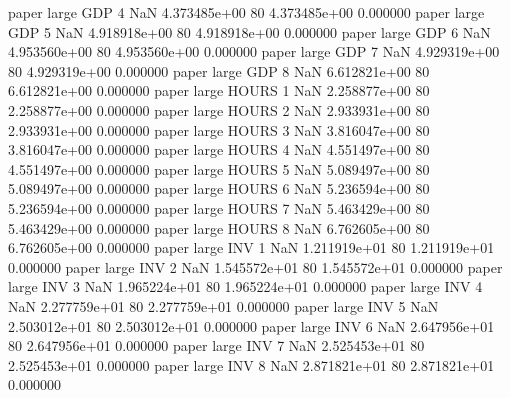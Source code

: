             paper      large      GDP                 4                  NaN 4.373485e+00 80   4.373485e+00           0.000000
            paper      large      GDP                 5                  NaN 4.918918e+00 80   4.918918e+00           0.000000
            paper      large      GDP                 6                  NaN 4.953560e+00 80   4.953560e+00           0.000000
            paper      large      GDP                 7                  NaN 4.929319e+00 80   4.929319e+00           0.000000
            paper      large      GDP                 8                  NaN 6.612821e+00 80   6.612821e+00           0.000000
            paper      large    HOURS                 1                  NaN 2.258877e+00 80   2.258877e+00           0.000000
            paper      large    HOURS                 2                  NaN 2.933931e+00 80   2.933931e+00           0.000000
            paper      large    HOURS                 3                  NaN 3.816047e+00 80   3.816047e+00           0.000000
            paper      large    HOURS                 4                  NaN 4.551497e+00 80   4.551497e+00           0.000000
            paper      large    HOURS                 5                  NaN 5.089497e+00 80   5.089497e+00           0.000000
            paper      large    HOURS                 6                  NaN 5.236594e+00 80   5.236594e+00           0.000000
            paper      large    HOURS                 7                  NaN 5.463429e+00 80   5.463429e+00           0.000000
            paper      large    HOURS                 8                  NaN 6.762605e+00 80   6.762605e+00           0.000000
            paper      large      INV                 1                  NaN 1.211919e+01 80   1.211919e+01           0.000000
            paper      large      INV                 2                  NaN 1.545572e+01 80   1.545572e+01           0.000000
            paper      large      INV                 3                  NaN 1.965224e+01 80   1.965224e+01           0.000000
            paper      large      INV                 4                  NaN 2.277759e+01 80   2.277759e+01           0.000000
            paper      large      INV                 5                  NaN 2.503012e+01 80   2.503012e+01           0.000000
            paper      large      INV                 6                  NaN 2.647956e+01 80   2.647956e+01           0.000000
            paper      large      INV                 7                  NaN 2.525453e+01 80   2.525453e+01           0.000000
            paper      large      INV                 8                  NaN 2.871821e+01 80   2.871821e+01           0.000000

